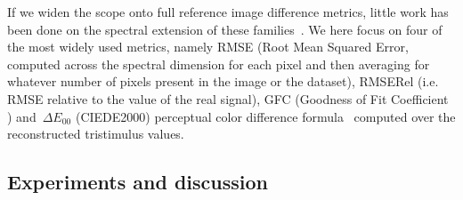 \documentclass[10pt,twocolumn,letterpaper]{article}
\begin{document}
If we widen the scope onto full reference image difference metrics, little work has been done on the spectral extension of these families~\cite{moan_image-difference_2014}. We here focus on four of the most widely used metrics, namely RMSE (Root Mean Squared Error, computed across the spectral dimension for each pixel and then averaging for whatever number of pixels present in the image or the dataset), RMSERel (i.e. RMSE relative to the value of the real signal), GFC (Goodness of Fit Coefficient \cite{romero1997linear}) and~$\Delta E_{00}$ (CIEDE2000) perceptual color difference formula~\cite{cie_cie_2001} computed over the reconstructed tristimulus values.
\subsection{Experiments and discussion}
\end{document}
